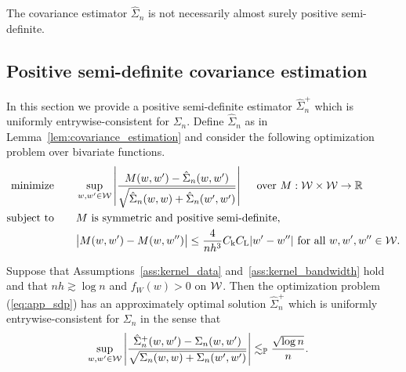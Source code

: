 \begin{remark}

  The covariance estimator $\hat \Sigma_n$
  is not necessarily almost surely positive semi-definite.

\end{remark}

\subsection{Positive semi-definite covariance estimation}
\label{sec:PSD}

In this section we provide a
positive semi-definite estimator $\hat \Sigma_n^+$
which is uniformly entrywise-consistent for $\Sigma_n$.
Define $\hat \Sigma_n$ as in
Lemma~\ref{lem:covariance_estimation}
and consider the following optimization problem
over bivariate functions.
\begin{equation}
  \label{eq:app_sdp}
  \begin{aligned}
    \operatorname*{minimize}
    \qquad
    & \sup_{w,w' \in \mathcal{W}}
    \left|
    \frac{M(w,w') - \hat\Sigma_n(w,w')}
    {\sqrt{\hat \Sigma_n(w,w) + \hat \Sigma_n(w',w')}}
    \right|
    \quad \textup{ over } M: \mathcal{W} \times \mathcal{W} \to \mathbb{R}
    \\
    \operatorname*{subject\ to}
    \qquad
    & M \textup{ is symmetric and positive semi-definite}, \\
    & \big|M(w,w') - M(w, w'')\big|
    \leq \frac{4}{n h^3}
    C_\mathrm{k} C_\mathrm{L}
    |w'-w''|
    \textup{ for all }
    w, w', w'' \in \mathcal{W}.
  \end{aligned}
\end{equation}

\begin{lemma}
  \label{lem:app_sdp}

  Suppose that Assumptions~\ref{ass:kernel_data}
  and~\ref{ass:kernel_bandwidth} hold and that
  $n h \gtrsim \log n$ and $f_W(w) > 0$ on $\mathcal{W}$.
  Then the optimization problem (\ref{eq:app_sdp})
  has an approximately optimal solution $\hat\Sigma_n^+$
  which is uniformly entrywise-consistent
  for $\Sigma_n$ in the sense that
  \begin{align*}
    \sup_{w,w' \in \mathcal{W}}
    \left|
    \frac{\hat \Sigma_n^+(w,w') - \Sigma_n(w,w')}
    {\sqrt{\Sigma_n(w,w) + \Sigma_n(w',w')}}
    \right|
    &\lesssim_{\mathbb{P}}
    \frac{\sqrt{\log n}}{n}.
  \end{align*}

\end{lemma}


